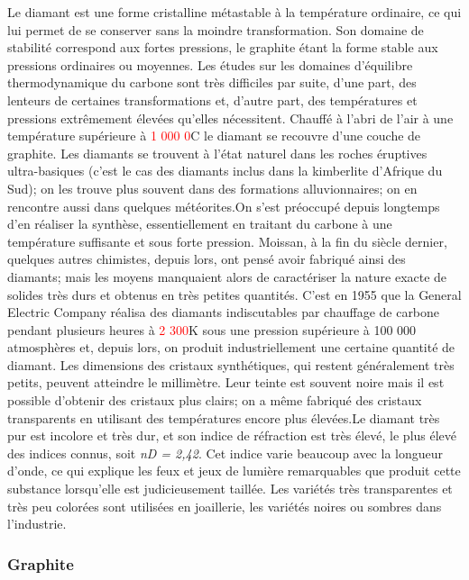 \documentclass[]{article}
\begin{document}
Le diamant est une forme cristalline
métastable à la température ordinaire, ce qui lui permet de
se conserver sans la moindre transformation. Son domaine de
stabilité correspond aux fortes pressions, le graphite étant la
forme stable aux pressions ordinaires ou moyennes. Les études sur
les domaines d'équilibre thermodynamique du carbone sont très
difficiles par suite, d'une part, des lenteurs de certaines
transformations et, d'autre part, des températures et pressions
extrêmement élevées qu'elles nécessitent. Chauffé à
l'abri de l'air à une température supérieure à
\textcolor{red}{1 000 0}C le diamant se recouvre d'une couche de graphite.  Les
diamants se trouvent à l'état naturel dans les roches
éruptives ultra-basiques (c'est le cas des diamants inclus dans la
kimberlite d'Afrique du Sud); on les trouve plus souvent dans des
formations alluvionnaires; on en rencontre aussi dans quelques
météorites.On s'est préoccupé depuis longtemps d'en
réaliser la synthèse, essentiellement en traitant du carbone
à une température suffisante et sous forte pression. Moissan,
à la fin du siècle dernier, quelques autres chimistes, depuis
lors, ont pensé avoir fabriqué ainsi des diamants; mais les
moyens manquaient alors de caractériser la nature exacte de solides
très durs et obtenus en très petites quantités. C'est en 1955
que la General Electric Company réalisa des diamants indiscutables
par chauffage de carbone pendant plusieurs heures à \textcolor{red}{2 300}K
sous une pression supérieure à 100 000 atmosphères et,
depuis lors, on produit industriellement une certaine quantité de
diamant. Les dimensions des cristaux synthétiques, qui restent
généralement très petits, peuvent atteindre le
millimètre. Leur teinte est souvent noire mais il est possible
d'obtenir des cristaux plus clairs; on a même fabriqué des
cristaux transparents en utilisant des températures encore plus
élevées.Le diamant très pur est incolore et très dur, et
son indice de réfraction est très élevé, le plus
élevé des indices connus, soit \textit{nD = 2,42}. Cet indice
varie beaucoup avec la longueur d'onde, ce qui explique les feux et
jeux de lumière remarquables que produit cette substance
lorsqu'elle est judicieusement taillée. Les variétés très
transparentes et très peu colorées sont utilisées en
joaillerie, les variétés noires ou sombres dans l'industrie.

\subsubsection{Graphite} 
\end{document}
